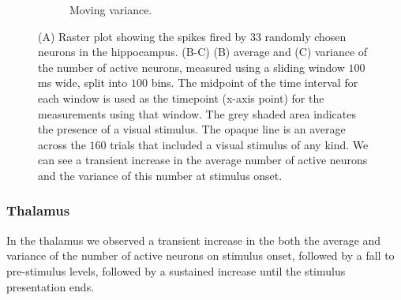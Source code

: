 \begin{figure}[p]
\begin{subfigure}[h]{\linewidth}
        \caption{Moving variance.}
        \label{fig:hippocampus_moving_var_num_active_cells}
      \end{subfigure}
      \caption{(A) Raster plot showing the spikes fired by $33$ randomly chosen neurons in the hippocampus. (B-C) (B) average and (C) variance of the number of active neurons, measured using a sliding window $100$ms wide, split into $100$ bins. The midpoint of the time interval for each window is used as the timepoint (x-axis point) for the measurements using that window. The grey shaded area indicates the presence of a visual stimulus. The opaque line is an average across the $160$ trials that included a visual stimulus of any kind. We can see a transient increase in the average number of active neurons and the variance of this number at stimulus onset.}
      \label{fig:hippocampus_moving_avg_and_var}
    \end{figure}

    \subsubsection{Thalamus}
    In the thalamus we observed a transient increase in the both the average and variance of the number of active neurons on stimulus onset, followed by a fall to pre-stimulus levels, followed by a sustained increase until the stimulus presentation ends.

